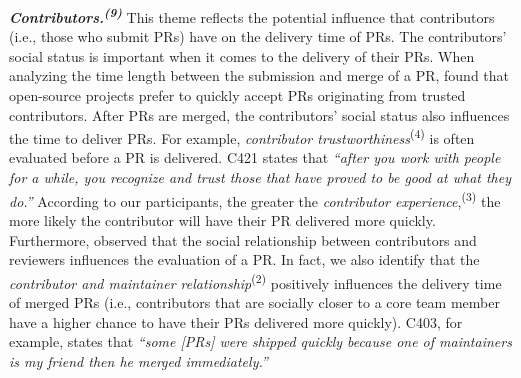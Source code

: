 \vspace{0.6mm}
\noindent\textit{\textbf{Contributors.\textsuperscript{(9)}}} This theme reflects the potential influence that contributors (i.e., those who submit PRs) have on the delivery time of PRs. The contributors' social status is important when it comes to the delivery of their PRs. When analyzing the time length between the submission and merge of a PR, \cite{Yu2016-cy} found that open-source projects prefer to quickly accept PRs originating from trusted contributors. After PRs are merged, the contributors' social status also influences the time to deliver PRs. For example, \textit{contributor trustworthiness}\textsuperscript{(4)} is often evaluated before a PR is delivered. C421 states that \textit{``after you work with people for a while, you recognize and trust those that have proved to be good at what they do.''} According to our participants, the greater the \textit{contributor experience},\textsuperscript{(3)} the more likely the contributor will have their PR delivered more quickly. 
Furthermore, \cite{soares2018factors} observed that the social relationship between contributors and reviewers influences the evaluation of a PR. In fact, we also identify that the \textit{contributor and maintainer relationship}\textsuperscript{(2)} positively influences the delivery time of merged PRs (i.e., contributors that are socially closer to a core team member have a higher chance to have their PRs delivered more quickly). C403, for example, states that \textit{``some [PRs] were shipped quickly because one of maintainers is my friend then he merged immediately.''}

